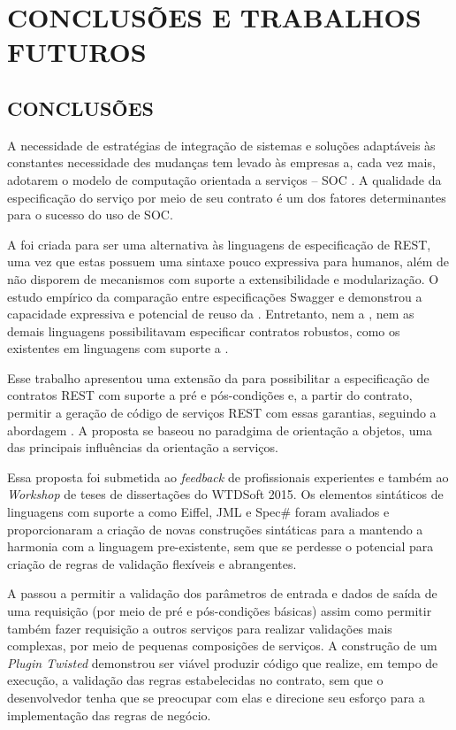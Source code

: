 \chapter{CONCLUSÕES E TRABALHOS FUTUROS}
\vspace{-6mm}

\section{CONCLUSÕES}
\vspace{-6mm}

A necessidade de estratégias de integração de sistemas e soluções adaptáveis às
constantes necessidade des mudanças tem levado às empresas a, cada vez mais,
adotarem o modelo de computação orientada a serviços -- SOC
\cite{papazoglou2008service} \cite{erl2009web}. A qualidade da especificação do
serviço por meio de seu contrato é um dos fatores determinantes para o sucesso
do uso de SOC.

A \neoidl{} foi criada para ser uma alternativa às linguagens de especificação
de \wss REST, uma vez que estas possuem uma sintaxe pouco expressiva para humanos,
além de não disporem de mecanismos com suporte a extensibilidade e modularização. O estudo
empírico da comparação entre especificações Swagger e \neoidl{} demonstrou a capacidade
expressiva e potencial de reuso da \neoidl{}. 
Entretanto, nem a \neoidl{}, nem as demais linguagens possibilitavam especificar 
contratos robustos, como os existentes em linguagens com suporte a \designbycontract{}.

Esse trabalho apresentou uma extensão da \neoidl{} para possibilitar a especificação
de contratos REST com suporte a pré e pós-condições e, a partir do contrato, permitir
a geração de código de serviços REST com essas garantias, seguindo a abordagem
\CtFirst{}. A proposta se baseou no paradgima de orientação a objetos, uma das 
principais influências da orientação a serviços.

Essa proposta foi submetida ao \textit{feedback} de profissionais experientes e também ao 
\textit{Workshop} de teses de dissertações do WTDSoft 2015. Os elementos sintáticos
de linguagens com suporte a \designbycontract{} como Eiffel, JML e Spec\# foram avaliados
e proporcionaram a criação de novas construções sintáticas para a \neoidl{} mantendo a harmonia com 
a linguagem pre-existente, sem que se perdesse o potencial para criação de regras de validação flexíveis e abrangentes.

A \neoidl{} passou a permitir a validação dos parâmetros de entrada e dados
de saída de uma requisição (por meio de pré e pós-condições básicas) assim como
permitir também fazer requisição a outros serviços para realizar validações mais complexas, por meio de pequenas composições de serviços. A construção de um \textit{Plugin Twisted} demonstrou ser
viável produzir código que realize, em tempo de execução, a validação das regras estabelecidas no contrato, sem que o 
desenvolvedor tenha que se preocupar com elas e direcione seu esforço para a implementação das regras
de negócio.

